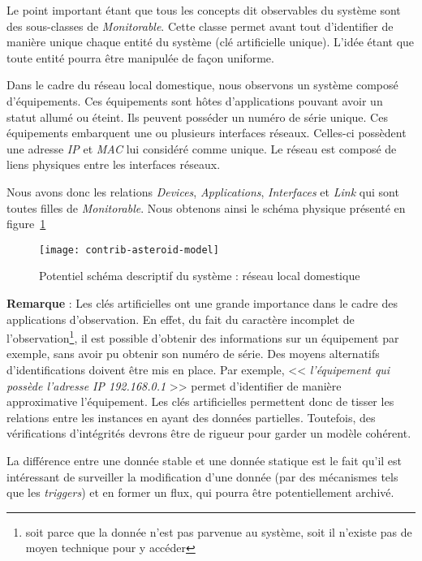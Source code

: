 Le point important étant que tous les concepts dit observables du système sont des sous-classes de \textit{Monitorable}. Cette classe permet avant tout d'identifier de manière unique chaque entité du système (clé artificielle unique). L'idée étant que toute entité pourra être manipulée de façon uniforme.

\begin{example}
	Dans le cadre du réseau local domestique, nous observons un système composé d'équipements. Ces équipements sont hôtes d'applications pouvant avoir un statut allumé ou éteint. Ils peuvent posséder un numéro de série unique. Ces équipements embarquent une ou plusieurs interfaces réseaux. Celles-ci possèdent une adresse \textit{IP} et \textit{MAC} lui considéré comme unique. Le réseau est composé de liens physiques entre les interfaces réseaux.
	
	Nous avons donc les relations \textit{Devices}, \textit{Applications}, \textit{Interfaces} et \textit{Link} qui sont toutes filles de \textit{Monitorable}. Nous obtenons ainsi le schéma physique présenté en figure~\ref{fig:contrib:asteroid:theorie:model}
	\begin{figure}[ht]
                \centering
		\texttt{[image: contrib-asteroid-model]}
		\caption{Potentiel schéma descriptif du système : réseau local domestique}\label{fig:contrib:asteroid:theorie:model}
	\end{figure}
\end{example}

\noindent \textbf{Remarque} : Les clés artificielles ont une grande importance dans le cadre des applications d'observation. En effet, du fait du caractère incomplet de l'observation\footnote{soit parce que la donnée n'est pas parvenue au système, soit il n'existe pas de moyen technique pour y accéder}, il est possible d'obtenir des informations sur un équipement par exemple, sans avoir pu obtenir son numéro de série. Des moyens alternatifs d'identifications doivent être mis en place. Par exemple, << \textit{l'équipement qui possède l'adresse IP 192.168.0.1} >> permet d'identifier de manière approximative l'équipement. Les clés artificielles permettent donc de tisser les relations entre les instances en ayant des données partielles. Toutefois, des vérifications d'intégrités devrons être de rigueur pour garder un modèle cohérent.

La différence entre une donnée stable et une donnée statique est le fait qu'il est intéressant de surveiller la modification d'une donnée (par des mécanismes tels que les \textit{triggers}) et en former un flux, qui pourra être potentiellement archivé.

